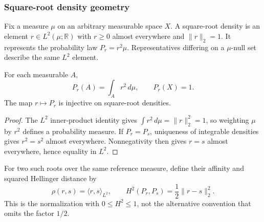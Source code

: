 \subsubsection{Square-root density geometry}
\label{sec:hellinger-geometry}

Fix a measure $\mu$ on an arbitrary measurable space $X$.
A square-root density is an element $r\in L^2(\mu;\mathbb R)$ with
$r\ge0$ almost everywhere and $\|r\|_2=1$. It represents the
probability law $P_r=r^2\mu$. Representatives differing on a
$\mu$-null set describe the same $L^2$ element.

\begin{lemma}
\label{lem:root-law}
For each measurable $A$,
\[
 P_r(A)=\int_A r^2\,d\mu,\qquad P_r(X)=1.
\]
The map $r\mapsto P_r$ is injective on square-root densities.
\end{lemma}
\begin{proof}
The $L^2$ inner-product identity gives $\int r^2\,d\mu=\|r\|_2^2=1$,
so weighting $\mu$ by $r^2$ defines a probability measure.
If $P_r=P_s$, uniqueness of integrable densities gives $r^2=s^2$
almost everywhere. Nonnegativity then gives $r=s$ almost everywhere,
hence equality in $L^2$.
\end{proof}

For two such roots over the same reference measure, define their
affinity and squared Hellinger distance by
\[
 \rho(r,s)=\langle r,s\rangle_{L^2},\qquad
 H^2(P_r,P_s)=\frac12\|r-s\|_2^2.
\]
This is the normalization with $0\le H^2\le1$, not the alternative
convention that omits the factor $1/2$.

